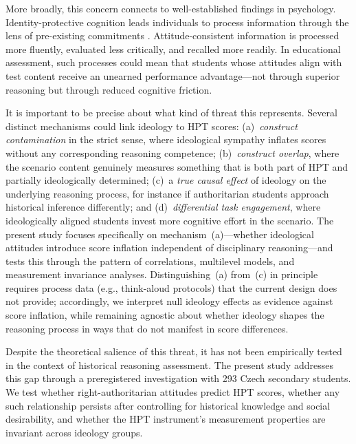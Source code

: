 \documentclass[pdflatex,sn-apa]{sn-jnl}%
\begin{document}
More broadly, this concern connects to well-established findings in psychology. Identity-protective cognition leads individuals to process information through the lens of pre-existing commitments \citep{Kahan2017, Jost2003}. Attitude-consistent information is processed more fluently, evaluated less critically, and recalled more readily. In educational assessment, such processes could mean that students whose attitudes align with test content receive an unearned performance advantage---not through superior reasoning but through reduced cognitive friction.

It is important to be precise about what kind of threat this represents. Several distinct mechanisms could link ideology to HPT scores: (a)~\emph{construct contamination} in the strict sense, where ideological sympathy inflates scores without any corresponding reasoning competence; (b)~\emph{construct overlap}, where the scenario content genuinely measures something that is both part of HPT and partially ideologically determined; (c)~a \emph{true causal effect} of ideology on the underlying reasoning process, for instance if authoritarian students approach historical inference differently; and (d)~\emph{differential task engagement}, where ideologically aligned students invest more cognitive effort in the scenario. The present study focuses specifically on mechanism~(a)---whether ideological attitudes introduce score inflation independent of disciplinary reasoning---and tests this through the pattern of correlations, multilevel models, and measurement invariance analyses. Distinguishing~(a) from~(c) in principle requires process data (e.g., think-aloud protocols) that the current design does not provide; accordingly, we interpret null ideology effects as evidence against score inflation, while remaining agnostic about whether ideology shapes the reasoning process in ways that do not manifest in score differences.

Despite the theoretical salience of this threat, it has not been empirically tested in the context of historical reasoning assessment. The present study addresses this gap through a preregistered investigation with 293 Czech secondary students. We test whether right-authoritarian attitudes predict HPT scores, whether any such relationship persists after controlling for historical knowledge and social desirability, and whether the HPT instrument's measurement properties are invariant across ideology groups.

\end{document}
